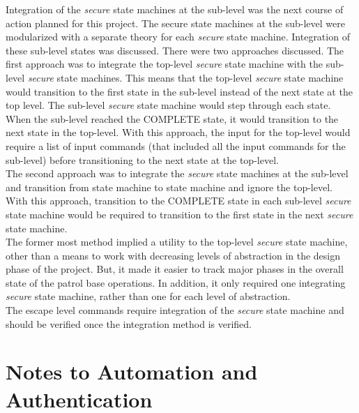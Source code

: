 Integration of the \emph{secure} state machines at the sub-level was the next course of action planned for
this project.  The secure state machines at the sub-level were modularized with a separate theory for each
\emph{secure} state machine.  Integration of these sub-level states was discussed.  There were two approaches
discussed.  The first approach was to integrate the top-level \emph{secure} state machine with the sub-level
\emph{secure} state machines.  This means that the top-level \emph{secure} state machine would transition to
the first state in the sub-level instead of the next state at the top level.  The sub-level \emph{secure}
state machine would step through each state.  When the sub-level reached the COMPLETE state, it would transition
to the next state in the top-level.    With this approach, the input for the top-level would require a list of
input commands (that included all the input commands for the sub-level) before transitioning to the next state
at the top-level.\\

The second approach was to integrate the \emph{secure} state machines at the sub-level and transition from
state machine to state machine and ignore the top-level.  With this approach, transition to the COMPLETE state
in each sub-level \emph{secure} state machine would be required to transition to the first state in the next
\emph{secure} state machine.  \\

The former most method implied a utility to the top-level \emph{secure} state machine, other than a means to
work with decreasing levels of abstraction in the design phase of the project.  But, it made it easier to track
major phases in the overall state of the patrol base operations.  In addition, it only required one integrating
\emph{secure} state machine, rather than one for each level of abstraction. \\

The escape level commands require integration of the \emph{secure} state machine and should be verified once the
integration method is verified.

\section*{Notes to Automation and Authentication}
\label{sec:notes-autom-auth}

